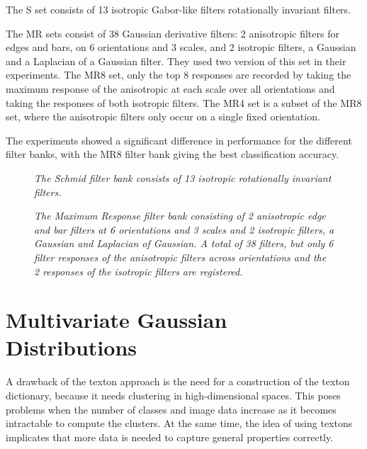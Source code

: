 The S set consists of 13 isotropic Gabor-like filters rotationally invariant filters.

The MR sets consist of 38 Gaussian derivative filters: 2 anisotropic filters for edges and bars, on 6 orientations and 3 scales, and 2 isotropic filters, a Gaussian and a Laplacian of a Gaussian filter. They used two version of this set in their experiments. The MR8 set, only the top 8 responses are recorded by taking the maximum response of the anisotropic at each scale over all orientations and taking the responses of both isotropic filters. The MR4 set is a subset of the MR8 set, where the anisotropic filters only occur on a single fixed orientation.

The experiments showed a significant difference in performance for the different filter banks, with the MR8 filter bank giving the best classification accuracy. 

\begin{figure}[t]
	\begin{center}
	\end{center}
	\caption{\textit{The Schmid filter bank consists of 13 isotropic rotationally invariant filters.}}
	\label{fig:S}
\end{figure}

\begin{figure}[b]
	\begin{center}
	\end{center}
	\caption{\textit{The Maximum Response filter bank consisting of 2 anisotropic edge and bar filters at 6 orientations and 3 scales and 2 isotropic filters, a Gaussian and Laplacian of Gaussian. A total of 38 filters, but only 6 filter responses of the anisotropic filters across orientations and the 2 responses of the isotropic filters are registered.}}
	\label{fig:MR}
\end{figure}

\section{Multivariate Gaussian Distributions}\label{sec:MGD}
A drawback of the texton approach is the need for a construction of the texton dictionary, because it needs clustering in high-dimensional spaces. This poses problems when the number of classes and image data increase as it becomes intractable to compute the clusters. At the same time, the idea of using textons implicates that more data is needed to capture general properties correctly.

